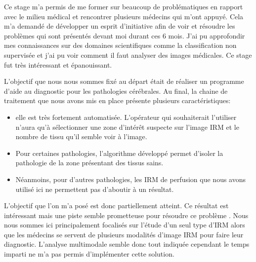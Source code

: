 Ce stage m'a permis de me former sur beaucoup de problématiques en rapport avec le milieu médical et rencontrer plusieurs médecins qui m'ont appuyé. Cela m'a demandé de développer un esprit d'initiative afin de voir et résoudre les problèmes qui sont présentés devant moi durant ces 6 mois. J'ai pu approfondir mes connaissances sur des domaines scientifiques comme la classification non supervisée et j'ai pu voir comment il faut analyser des images médicales. Ce stage fut très intéressant et épanouissant.

\medskip

L'objectif que nous nous sommes fixé au départ était de réaliser un programme d'aide au diagnostic pour les pathologies cérébrales. Au final, la chaine de traitement que nous avons mis en place présente plusieurs caractéristiques:

\begin{itemize}
\item elle est très fortement automatisée. L'opérateur qui souhaiterait l'utiliser n'aura qu'à sélectionner une zone d'intérêt suspecte sur l'image IRM et le nombre de tissu qu'il semble voir à l'image.
\item Pour certaines pathologies, l'algorithme développé permet d'isoler la pathologie de la zone présentant des tissus sains.
\item Néanmoins, pour d'autres pathologies, les IRM de perfusion que nous avons utilisé ici ne permettent pas d'aboutir à un résultat.
\end{itemize} 

L'objectif que l'on m'a posé est donc partiellement atteint. Ce résultat est intéressant mais une piste semble prometteuse pour résoudre ce problème . Nous nous sommes ici principalement focalisés sur l'étude d'un seul type d'IRM alors que les médecins se servent de plusieurs modalités d'image IRM pour faire leur diagnostic. L'analyse multimodale semble donc tout indiquée cependant le temps imparti ne m'a pas permis d'implémenter cette solution.